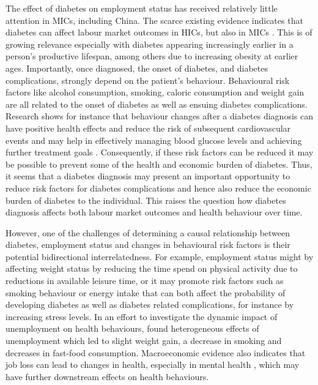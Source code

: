 The effect of diabetes on employment status has received relatively little attention in \acp{MIC}, including China. The scarce existing evidence indicates that diabetes can affect labour market outcomes in \acp{HIC}, but also in \acp{MIC} \parencite{Seuring2016}. This is of growing relevance especially with diabetes appearing increasingly earlier in a person's productive lifespan, among others due to increasing obesity at earlier ages. Importantly, once diagnosed, the onset of diabetes, and diabetes complications, strongly depend on the patient's behaviour. Behavioural risk factors like alcohol consumption, smoking, caloric consumption and weight gain are all related to the onset of diabetes as well as ensuing diabetes complications. Research shows for instance that behaviour changes after a diabetes diagnosis can have positive health effects and reduce the risk of subsequent cardiovascular events \parencite{Long2014} and may help in effectively managing blood glucose levels and achieving further treatment goals \parencite{Zhou2016}. Consequently, if these risk factors can be reduced it may be possible to prevent some of the health and economic burden of diabetes. Thus, it seems that a diabetes diagnosis may present an important opportunity to reduce risk factors for diabetes complications \parencite{DeFineOlivarius2015} and hence also reduce the economic burden of diabetes to the individual. This raises the question how diabetes diagnosis affects both labour market outcomes and health behaviour over time.

However, one of the challenges of determining a causal relationship between  diabetes, employment status and changes in behavioural risk factors is their potential bidirectional interrelatedness. For example, employment status might by affecting weight status by reducing the time spend on physical activity due to reductions in available leisure time, or it may promote risk factors such as smoking behaviour or energy intake that can both affect the probability of developing diabetes as well as diabetes related complications, for instance by increasing stress levels. In an effort to  investigate the dynamic impact of unemployment on health behaviours, \textcite{Colman2014} found heterogeneous effects of unemployment which led to slight weight gain, a decrease in smoking and decreases in fast-food consumption. Macroeconomic evidence also indicates that job loss can lead to changes in health, especially in mental health \parencite{Charles2008}, which may have further downstream effects on health behaviours.

